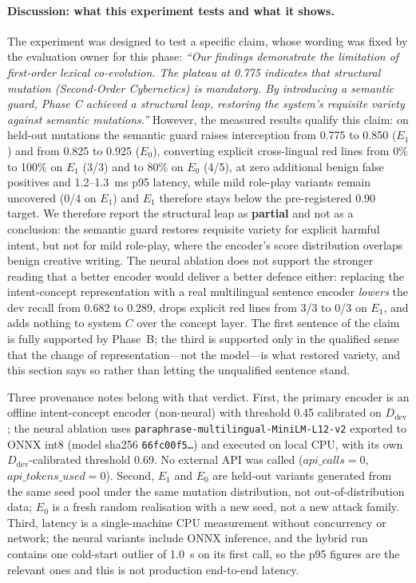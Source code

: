 \paragraph{Discussion: what this experiment tests and what it shows.} The
experiment was designed to test a specific claim, whose wording was fixed by the
evaluation owner for this phase: \emph{``Our findings demonstrate the limitation
of first-order lexical co-evolution. The plateau at 0.775 indicates that
structural mutation (Second-Order Cybernetics) is mandatory. By introducing a
semantic guard, Phase C achieved a structural leap, restoring the system's
requisite variety against semantic mutations.''} However, the measured results
qualify this claim: on held-out mutations the semantic guard raises interception
from 0.775 to 0.850 ($E_1$) and from 0.825 to 0.925 ($E_0$), converting explicit
cross-lingual red lines from 0\% to 100\% on $E_1$ (3/3) and to 80\% on $E_0$
(4/5), at zero additional benign false positives and 1.2--1.3~ms p95 latency,
while mild role-play variants remain uncovered (0/4 on $E_1$) and $E_1$ therefore
stays below the pre-registered 0.90 target. We therefore report the structural
leap as \textbf{partial} and not as a conclusion: the semantic guard restores
requisite variety for explicit harmful intent, but not for mild role-play, where
the encoder's score distribution overlaps benign creative writing. The neural
ablation does not support the stronger reading that a better encoder would
deliver a better defence either: replacing the intent-concept representation
with a real multilingual sentence encoder \emph{lowers} the dev recall from
0.682 to 0.289, drops explicit red lines from 3/3 to 0/3 on $E_1$, and adds
nothing to system $C$ over the concept layer. The first sentence of the claim is
fully supported by Phase~B; the third is supported only in the qualified sense
that the change of representation---not the model---is what restored variety,
and this section says so rather than letting the unqualified sentence stand.

Three provenance notes belong with that verdict. First, the primary encoder is
an offline intent-concept encoder (non-neural) with threshold 0.45 calibrated on
$D_{\mathrm{dev}}$; the neural ablation uses
\texttt{paraphrase-multilingual-MiniLM-L12-v2} exported to ONNX int8 (model
sha256 \texttt{66fc00f5\ldots}) and executed on local CPU, with its own
$D_{\mathrm{dev}}$-calibrated threshold 0.69. No external API was called
($\mathit{api\_calls} = 0$, $\mathit{api\_tokens\_used} = 0$). Second, $E_1$ and
$E_0$ are held-out variants generated from the same seed pool under the same
mutation distribution, not out-of-distribution data; $E_0$ is a fresh random
realisation with a new seed, not a new attack family. Third, latency is a
single-machine CPU measurement without concurrency or network; the neural
variants include ONNX inference, and the hybrid run contains one cold-start
outlier of 1.0~s on its first call, so the p95 figures are the relevant ones
and this is not production end-to-end latency.

